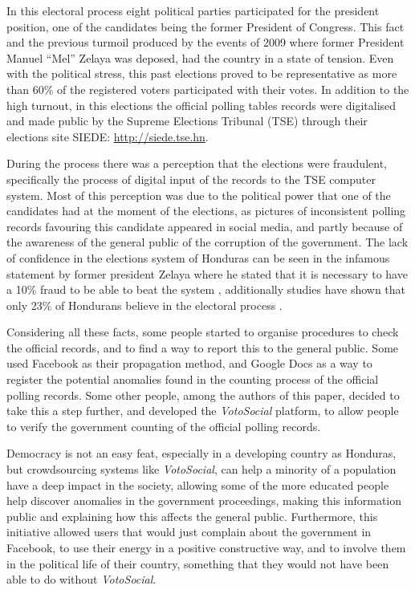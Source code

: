 \documentclass[letterpaper,10pt]{article}
\begin{document}
In this electoral process eight political parties participated for the president position, one of the candidates being the former President of Congress. This fact and the previous turmoil produced by the events of 2009 where former President Manuel “Mel” Zelaya was deposed, had the country in a state of tension. Even with the political stress, this past elections proved to be representative as more than 60\% of the registered voters participated with their votes. In addition to the high turnout, in this elections the official polling tables records were digitalised and made public by the Supreme Elections Tribunal (TSE) through their elections site SIEDE: \url{http://siede.tse.hn}.

During the process there was a perception that the elections were fraudulent, specifically the process of digital input of the records to the TSE computer system. Most of this perception was due to the political power that one of the candidates had at the moment of the elections, as pictures of inconsistent polling records favouring this candidate appeared in social media, and partly because of the awareness of the general public of the corruption of the government. The lack of confidence in the elections system of Honduras can be seen in the infamous statement by former president Zelaya where he stated that it is necessary to have a 10\% fraud to be able to beat the system \citep{melvid}, additionally studies have shown that only 23\% of Hondurans believe in the electoral process \citep{romero2014}.

Considering all these facts, some people started to organise procedures to check the official records, and to find a way to report this to the general public. Some used Facebook as their propagation method, and Google Docs as a way to register the potential anomalies found in the counting process of the official polling records. Some other people, among the authors of this paper, decided to take this a step further, and developed the \textit{VotoSocial} platform, to allow people to verify the government counting of the official polling records.

Democracy is not an easy feat, especially in a developing country as Honduras, but crowdsourcing systems like \textit{VotoSocial}, can help a minority of a population have a deep impact in the society, allowing some of the more educated people help discover anomalies in the government proceedings, making this information public and explaining how this affects the general public. Furthermore, this initiative allowed users that would just complain about the government in Facebook, to use their energy in a positive constructive way, and to involve them in the political life of their country, something that they would not have been able to do without \textit{VotoSocial}.
\end{document}
